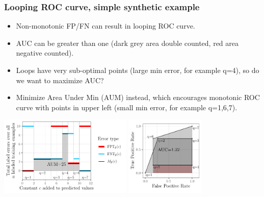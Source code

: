 \documentclass{beamer}
\begin{document}
\begin{frame}
  \frametitle{Looping ROC curve, simple synthetic example}

  \begin{itemize}
  \item Non-monotonic FP/FN can result in looping ROC curve.
  \item AUC can be greater than one (dark grey area double counted,
    red area negative counted).
  \item Loops have very sub-optimal points (large min error, for
    example q=4), so do we want to maximize AUC?
  \item Minimize Area Under Min (AUM) instead, which encourages
    monotonic ROC curve with points in upper left (small min error,
    for example q=1,6,7).
  \end{itemize}
 
  \includegraphics[height=1.5in]{figure-more-than-one-more-aum-nomath}
  \includegraphics[height=1.5in]{figure-more-than-one-more-auc}

\end{frame}
\end{document}
